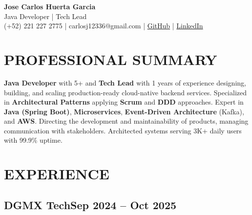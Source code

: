 \documentclass[a4paper,10pt]{article}
\newcommand{\kw}[1]{\textbf{\textcolor{keyword}{#1}}}
\begin{document}
\begin{center}
{\bfseries\LARGE Jose Carlos Huerta Garcia} \\
Java Developer | Tech Lead \\
(+52) 221 227 2775 | carlosj12336@gmail.com | \href{https://github.com/jcarloshg}{GitHub} | \href{https://www.linkedin.com/in/jose-carlos-huerta-garcia-773952212}{LinkedIn}
\end{center}

\section*{PROFESSIONAL SUMMARY}
\kw{Java Developer} with 5+ and \kw{Tech Lead } with 1 years of experience designing, building, and scaling production-ready cloud-native backend services. Specialized in \kw{Architectural Patterns} applying \kw{Scrum} and \kw{DDD} approaches. Expert in \kw{Java (Spring Boot)}, \kw{Microservices}, \kw{Event-Driven Architecture} (Kafka), and \kw{AWS}. Directing the development and maintainability of products, managing communication with stakeholders. Architected systems serving 3K+ daily users with 99.9\% uptime.

\section*{EXPERIENCE}

\subsection*{\small DGMX Tech\hfill\textbf{Sep 2024 -- Oct 2025}}
\end{document}
